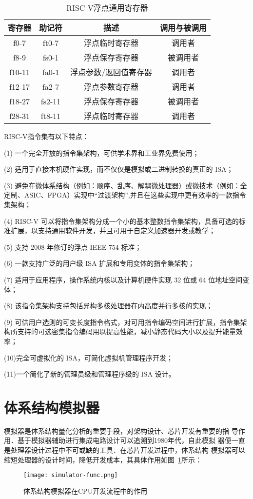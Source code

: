 \begin{table}[h]
  \centering
  \caption{RISC-V浮点通用寄存器}
  \label{tab:fpr}
  \begin{tabular}{cccc}
    \toprule
寄存器 &	助记符	& 描述 &	调用与被调用\\
    \midrule
    f0-7 & ft0-7 & 浮点临时寄存器 & 调用者\\
    f8-9 & fs0-1 & 浮点保存寄存器 & 被调用者\\
    f10-11 & fa0-1 & 浮点参数/返回值寄存器 & 调用者\\
    f12-17 & fa2-7 & 浮点参数寄存器 & 调用者\\
    f18-27 & fs2-11 & 浮点保存寄存器 & 被调用者\\
    f28-31 & ft8-11 & 浮点临时寄存器 & 调用者\\
    \bottomrule
  \end{tabular}
\end{table}


RISC-V指令集有以下特点：


(1) 一个完全开放的指令集架构，可供学术界和工业界免费使用；


(2) 适用于直接本机硬件实现，而不仅仅是模拟或二进制转换的真正的 ISA；


(3) 避免在微体系结构（例如：顺序、乱序、解耦微处理器）或微技术（例如：全定制、ASIC、FPGA）实现中“过渡架构”,并且在这些实现中更有效率的一款指令集架构；


(4) RISC-V 可以将指令集架构分成一个小的基本整数指令集架构，具备可选的标准扩展，以支持通用软件开发，并且可用于自定义加速器开发或教学；


(5) 支持 2008 年修订的浮点 IEEE-754 标准；


(6) 一款支持广泛的用户级 ISA 扩展和专用变体的指令集架构；


(7) 适用于应用程序，操作系统内核以及计算机硬件实现 32 位或 64 位地址空间变体；


(8) 该指令集架构支持包括异构多核处理器在内高度并行多核的实现；


(9) 可供用户选则的可变长度指令格式，对可用指令编码空间进行扩展，指令集架构所支持的可选密集指令编码用以提高性能，减小静态代码大小以及提升能量效率；


(10)完全可虚拟化的 ISA，可简化虚拟机管理程序开发；


(11)一个简化了新的管理员级和管理程序级的 ISA 设计。

\section{体系结构模拟器}
模拟器是体系结构量化分析的重要手段，对架构设计、芯片开发有重要的指
导作用．基于模拟器辅助进行集成电路设计可以追溯到1980年代\cite{mukherjee2002performance}，自此模拟
器便一直是处理器设计过程中不可或缺的工具．在芯片开发过程中，体系结构
模拟器可以缩短处理器的设计时间，降低开发成本，其具体作用如图~\ref{fig:sim-func}所示：
\begin{figure}[h]
  \centering
  \texttt{[image: simulator-func.png]}
  \caption{体系结构模拟器在CPU开发流程中的作用}
  \label{fig:sim-func}
\end{figure}


